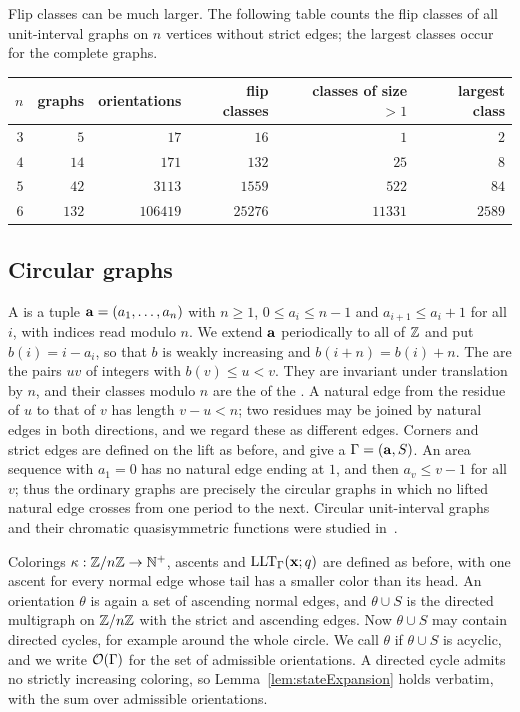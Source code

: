 Flip classes can be much larger.
The following table counts the flip classes of all unit-interval graphs on $n$
vertices without strict edges; the largest classes occur for the complete
graphs.
\begin{center}
\begin{tabular}{@{}rrrrrr@{}}
\toprule
$n$ & graphs & orientations & flip classes & classes of size $>1$ &
largest class \\
\midrule
$3$ & $5$ & $17$ & $16$ & $1$ & $2$ \\
$4$ & $14$ & $171$ & $132$ & $25$ & $8$ \\
$5$ & $42$ & $3113$ & $1559$ & $522$ & $84$ \\
$6$ & $132$ & $106419$ & $25276$ & $11331$ & $2589$ \\
\bottomrule
\end{tabular}
\end{center}

\subsection{Circular graphs}\label{subs:circularDefinitions}

A  is a tuple $\mathbf{a}=(a_1,\dotsc,a_n)$ with
$n\geq1$, $0\leq a_i\leq n-1$ and $a_{i+1}\leq a_i+1$ for all $i$, with indices
read modulo $n$.
We extend $\mathbf{a}$ periodically to all of $\mathbb{Z}$ and put $b(i)=i-a_i$, so that
$b$ is weakly increasing and $b(i+n)=b(i)+n$.
The  are the pairs $uv$ of integers with
$b(v)\leq u<v$.
They are invariant under translation by $n$, and their classes modulo $n$ are
the  of the .
A natural edge from the residue of $u$ to that of $v$ has length $v-u<n$; two
residues may be joined by natural edges in both directions, and we regard these
as different edges.
Corners and strict edges are defined on the lift as before, and give a
 $\Gamma=(\mathbf{a},S)$.
An area sequence with $a_1=0$ has no natural edge ending at $1$, and then
$a_v\leq v-1$ for all $v$; thus the ordinary graphs are precisely the circular
graphs in which no lifted natural edge crosses from one period to the next.
Circular unit-interval graphs and their chromatic quasisymmetric functions were
studied in~\cite{Ellzey2016,Ellzey2017,AlexanderssonPanova2018}.

Colorings $\kappa:\mathbb{Z}/n\mathbb{Z}\to\mathbb{N}^{+}$, ascents and $\operatorname{LLT}_\Gamma(\mathbf{x};q)$ are
defined as before, with one ascent for every normal edge whose tail has a
smaller color than its head.
An orientation $\theta$ is again a set of ascending normal edges, and
$\theta\cup S$ is the directed multigraph on $\mathbb{Z}/n\mathbb{Z}$ with the strict
and ascending edges.
Now $\theta\cup S$ may contain directed cycles, for example around the whole
circle.
We call $\theta$  if $\theta\cup S$ is acyclic, and we
write $\mathcal{O}(\Gamma)$ for the set of admissible orientations.
A directed cycle admits no strictly increasing coloring, so
Lemma~\ref{lem:stateExpansion} holds verbatim, with the sum over admissible
orientations.


